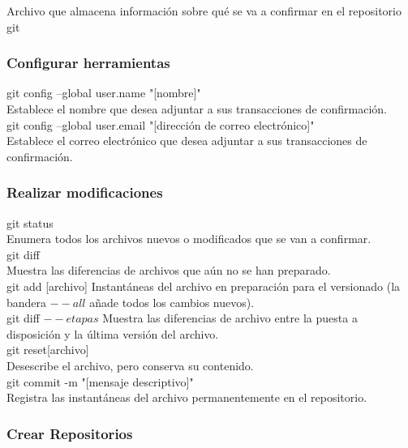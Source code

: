 \documentclass[]{article}
\begin{document}
 Archivo que almacena información sobre qué se va a confirmar en el repositorio git
  
  \subsubsection{Configurar herramientas}
 
 git config --global user.name "[nombre]"\\
 Establece el nombre que desea adjuntar a sus transacciones de confirmación.\\[0.5cm]
 
 git config --global user.email "[dirección de correo electrónico]"\\
 Establece el correo electrónico que desea adjuntar a sus transacciones de confirmación.\\[0.5cm]
 
 \subsubsection{Realizar modificaciones}
 
git status\\
 Enumera todos los archivos nuevos o modificados que se van a confirmar.\\[0.5cm]
 
 git diff\\
 Muestra las diferencias de archivos que aún no se han preparado.\\[0.5cm]
 
 git add [archivo]
 Instantáneas del archivo en preparación para el versionado (la bandera $--all$ añade todos los cambios nuevos).\\[0.5cm]
 
 git diff $--etapas$
 Muestra las diferencias de archivo entre la puesta a disposición y la última versión del archivo.\\[0.5cm]
 
 git reset[archivo]\\
 Desescribe el archivo, pero conserva su contenido.\\[0.5cm]
 
 git commit -m "[mensaje descriptivo]"\\
 Registra las instantáneas del archivo permanentemente en el repositorio.\\[0.5cm]
 
 
 \subsubsection{Crear Repositorios}
 
\end{document}
